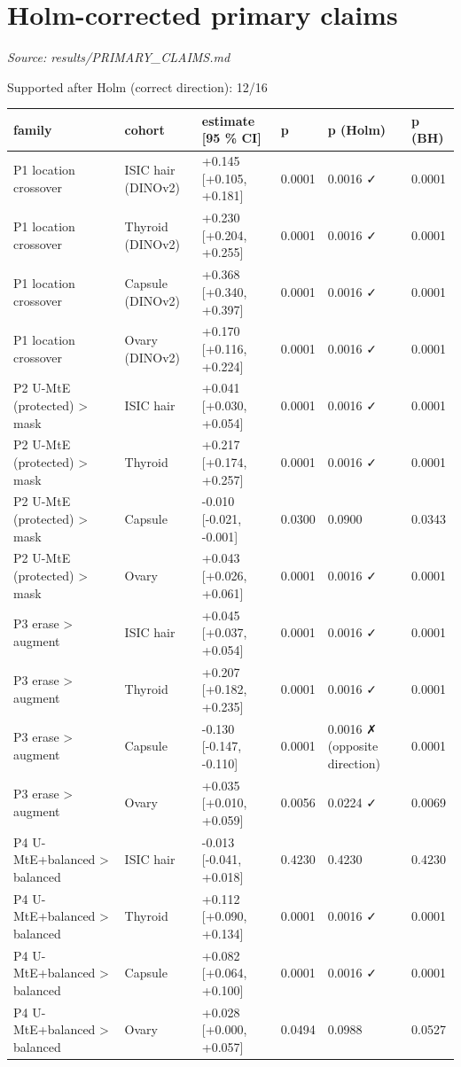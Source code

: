 \section{Holm-corrected primary claims}
\noindent\textit{Source: results/PRIMARY\_CLAIMS.md}

{\small
Supported after Holm (correct direction): 12/16

{ %
\begin{longtable}[]{@{}llllll@{}}
\toprule\noalign{}
family & cohort & estimate {[}95 \% CI{]} & p & p (Holm) & p (BH) \\
\midrule\noalign{}
\endhead
\bottomrule\noalign{}
\endlastfoot
P1 location crossover & ISIC hair (DINOv2) & +0.145 {[}+0.105, +0.181{]} & 0.0001 & 0.0016 ✓ & 0.0001 \\
P1 location crossover & Thyroid (DINOv2) & +0.230 {[}+0.204, +0.255{]} & 0.0001 & 0.0016 ✓ & 0.0001 \\
P1 location crossover & Capsule (DINOv2) & +0.368 {[}+0.340, +0.397{]} & 0.0001 & 0.0016 ✓ & 0.0001 \\
P1 location crossover & Ovary (DINOv2) & +0.170 {[}+0.116, +0.224{]} & 0.0001 & 0.0016 ✓ & 0.0001 \\
P2 U-MtE (protected) \textgreater{} mask & ISIC hair & +0.041 {[}+0.030, +0.054{]} & 0.0001 & 0.0016 ✓ & 0.0001 \\
P2 U-MtE (protected) \textgreater{} mask & Thyroid & +0.217 {[}+0.174, +0.257{]} & 0.0001 & 0.0016 ✓ & 0.0001 \\
P2 U-MtE (protected) \textgreater{} mask & Capsule & -0.010 {[}-0.021, -0.001{]} & 0.0300 & 0.0900 & 0.0343 \\
P2 U-MtE (protected) \textgreater{} mask & Ovary & +0.043 {[}+0.026, +0.061{]} & 0.0001 & 0.0016 ✓ & 0.0001 \\
P3 erase \textgreater{} augment & ISIC hair & +0.045 {[}+0.037, +0.054{]} & 0.0001 & 0.0016 ✓ & 0.0001 \\
P3 erase \textgreater{} augment & Thyroid & +0.207 {[}+0.182, +0.235{]} & 0.0001 & 0.0016 ✓ & 0.0001 \\
P3 erase \textgreater{} augment & Capsule & -0.130 {[}-0.147, -0.110{]} & 0.0001 & 0.0016 ✗ (opposite direction) & 0.0001 \\
P3 erase \textgreater{} augment & Ovary & +0.035 {[}+0.010, +0.059{]} & 0.0056 & 0.0224 ✓ & 0.0069 \\
P4 U-MtE+balanced \textgreater{} balanced & ISIC hair & -0.013 {[}-0.041, +0.018{]} & 0.4230 & 0.4230 & 0.4230 \\
P4 U-MtE+balanced \textgreater{} balanced & Thyroid & +0.112 {[}+0.090, +0.134{]} & 0.0001 & 0.0016 ✓ & 0.0001 \\
P4 U-MtE+balanced \textgreater{} balanced & Capsule & +0.082 {[}+0.064, +0.100{]} & 0.0001 & 0.0016 ✓ & 0.0001 \\
P4 U-MtE+balanced \textgreater{} balanced & Ovary & +0.028 {[}+0.000, +0.057{]} & 0.0494 & 0.0988 & 0.0527 \\
\end{longtable}
}

}

